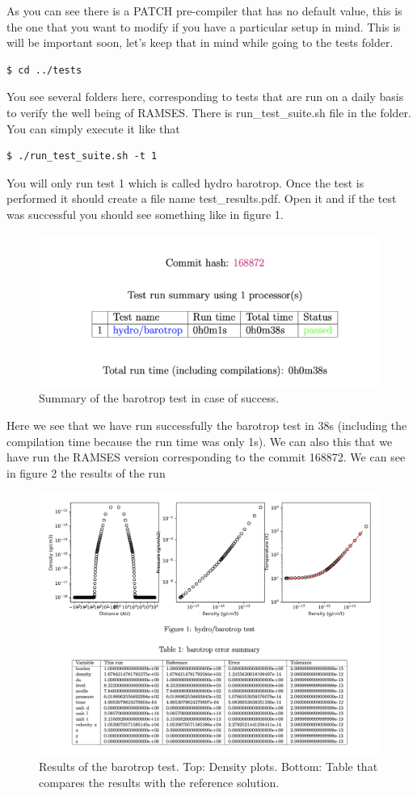 \documentclass{article}
\begin{document}
As you can see there is a PATCH pre-compiler that has no default value, this is the one that you want to modify if you have a particular setup in mind. This is will be important soon, let's keep that in mind while going to the tests folder.  
\begin{lstlisting}[]
$ cd ../tests
\end{lstlisting}
You see several folders here, corresponding to tests that are run on a daily basis to verify the well being of RAMSES. There is run\_test\_suite.sh file in the folder. You can simply execute it like that
\begin{lstlisting}[]
$ ./run_test_suite.sh -t 1
\end{lstlisting}
You will only run test 1 which is called hydro barotrop. Once the test is performed it should create a file name test\_results.pdf. Open it and if the test was successful you should see something like in figure 1.
\begin{figure}[h!]
\centerline{\includegraphics[width=\textwidth]{figures/test_success.png}}
\caption{Summary of the barotrop test in case of success.}
\end{figure}
Here we see that we have run successfully the barotrop test in 38s (including the compilation time because the run time was only 1s). We can also this that we have run the RAMSES version corresponding to the commit 168872. We can see in figure 2 the results of the run 
\begin{figure}[h!]
\centerline{\includegraphics[width=\textwidth]{figures/barotrop.png}}
\caption{Results of the barotrop test. Top: Density plots. Bottom: Table that compares the results with the reference solution.}
\end{figure}
\end{document}
